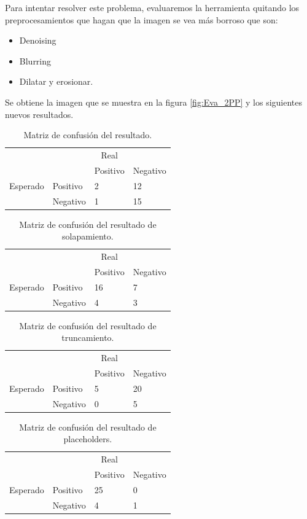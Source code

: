 Para intentar resolver este problema, evaluaremos la herramienta quitando los preprocesamientos que hagan que la imagen se vea más borroso que son:
\begin{itemize}
	\item Denoising
	\item Blurring
	\item Dilatar y erosionar.
\end{itemize}
Se obtiene la imagen que se muestra en la figura \ref{fig:Eva_2PP} y los siguientes nuevos resultados.
\begin{table}[H]
		\centering
	\begin{tabular}{llll}
		&          & \multicolumn{1}{c}{Real} &                            \\
		&          & Positivo                 & Negativo                   \\
		Esperado & Positivo & 2            & 12 \\
		& Negativo & 1        & 15                        
	\end{tabular}
	\caption{Matriz de confusión del resultado.}
	\label{table:mt_pos}
\end{table}
\begin{table}[H]
		\centering
	\begin{tabular}{llll}
		&          & \multicolumn{1}{c}{Real} &                            \\
		&          & Positivo                 & Negativo                   \\
		Esperado & Positivo & 16  & 7 \\
		& Negativo & 4    & 3                         
	\end{tabular}
	\caption{Matriz de confusión del resultado de solapamiento.}
	\label{table:mt_pos_sol}
\end{table}

\begin{table}[H]
		\centering
	\begin{tabular}{llll}
		&          & \multicolumn{1}{c}{Real} &                            \\
		&          & Positivo                 & Negativo                   \\
		Esperado & Positivo & 5  & 20 \\
		& Negativo & 0    & 5                         
	\end{tabular}
	\caption{Matriz de confusión del resultado de truncamiento.}
	\label{table:mt_pos_trun}
\end{table}
\begin{table}[H]
		\centering
	\begin{tabular}{llll}
		&          & \multicolumn{1}{c}{Real} &                            \\
		&          & Positivo                 & Negativo                   \\
		Esperado & Positivo & 25  & 0 \\
		& Negativo & 4    & 1                         
	\end{tabular}
	\caption{Matriz de confusión del resultado de placeholders.}
	\label{table:mt_pos_place}
\end{table}

